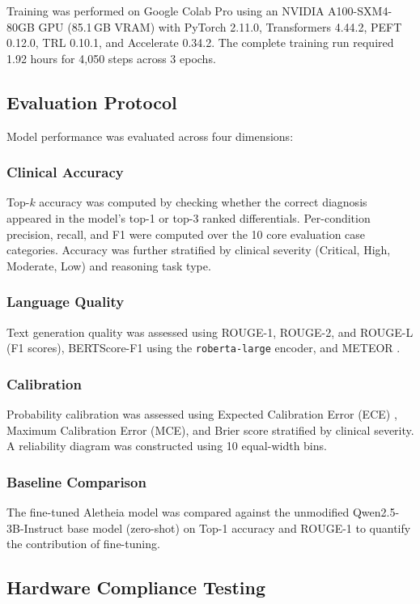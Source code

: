 \documentclass[journal]{IEEEtran}
\begin{document}
Training was performed on Google Colab Pro using an NVIDIA
A100-SXM4-80GB GPU (85.1\,GB VRAM) with PyTorch 2.11.0,
Transformers 4.44.2, PEFT 0.12.0, TRL 0.10.1, and
Accelerate 0.34.2. The complete training run required 1.92 hours
for 4{,}050 steps across 3 epochs.

\subsection{Evaluation Protocol}

Model performance was evaluated across four dimensions:

\subsubsection{Clinical Accuracy}
Top-$k$ accuracy was computed by checking whether the correct
diagnosis appeared in the model's top-1 or top-3 ranked
differentials. Per-condition precision, recall, and F1 were
computed over the 10 core evaluation case categories. Accuracy
was further stratified by clinical severity (Critical, High,
Moderate, Low) and reasoning task type.

\subsubsection{Language Quality}
Text generation quality was assessed using ROUGE-1, ROUGE-2,
and ROUGE-L \cite{lin2004rouge} (F1 scores), BERTScore-F1
\cite{zhang2019bertscore} using the \texttt{roberta-large} encoder,
and METEOR \cite{banerjee2005meteor}.

\subsubsection{Calibration}
Probability calibration was assessed using Expected Calibration
Error (ECE) \cite{naeini2015ece}, Maximum Calibration Error (MCE),
and Brier score \cite{brier1950brier} stratified by clinical
severity. A reliability diagram was constructed using 10 equal-width
bins.

\subsubsection{Baseline Comparison}
The fine-tuned Aletheia model was compared against the unmodified
Qwen2.5-3B-Instruct base model (zero-shot) on Top-1 accuracy and
ROUGE-1 to quantify the contribution of fine-tuning.

\subsection{Hardware Compliance Testing}
\end{document}
